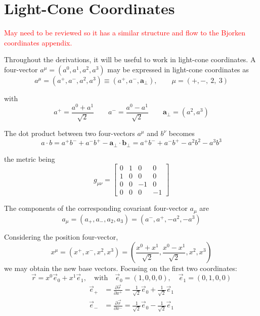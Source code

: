 \section{Light-Cone Coordinates}
\label{ap:Light_Cone}
\textcolor{red}{May need to be reviewed so it has a similar structure and flow to the Bjorken coordinates appendix.}

Throughout the derivations, it will be useful to work in light-cone coordinates. A four-vector $a^\mu = (a^0,a^1,a^2,a^3)$ may be expressed in light-cone coordinates as
\begin{equation}
  a^\mu = (a^+, a^-, a^2, a^3) \equiv (a^+, a^-, \mathbf{a}_\perp), \qquad \mu = (+,-,~2,~3)
\end{equation}

\noindent with
\begin{equation}
  a^+ = \frac{a^0 + a^1}{\sqrt{2}} \qquad a^- = \frac{a^0 - a^1}{\sqrt{2}} \qquad \mathbf{a}_\perp = (a^2,a^3)
\end{equation}

The dot product between two four-vectors $a^\mu$ and $b^\nu$ becomes
\begin{equation}
  a \cdot b =  a^+ b^- + a^- b^+ - \mathbf{a}_\perp \cdot \mathbf{b}_\perp = a^+ b^- + a^- b^+ - a^2 b^2 - a^3 b^3
\end{equation}

\noindent the metric being
\begin{equation}
  g_ {\mu \nu} = \begin{bmatrix}
    0 & 1 & 0 & 0 \\
    1 & 0 & 0 & 0 \\
    0 & 0 & -1 & 0 \\
    0 & 0 & 0 & -1
  \end{bmatrix}
  \label{eq:light_cone_metric}
\end{equation}

The components of the corresponding covariant four-vector $a_\mu$ are
\begin{equation}
  a_\mu = (a_+, a_-, a_2, a_3) = (a^-, a^+, -a^2, -a^3)
\end{equation}

Considering the position four-vector,
\begin{equation}
  x^\mu = (x^+, x^-, x^2, x^3) = \left( \frac{x^0+x^1}{\sqrt{2}}, \frac{x^0-x^1}{\sqrt{2}}, x^2, x^3  \right)
\end{equation}
we may obtain the new base vectors. Focusing on the first two coordinates:
\begin{equation}
  \vec{r} = x^0 \vec{e}_0 + x^1 \vec{e}_1, \quad \text{with} \quad \vec{e}_0 = (1,0,0,0), \quad \vec{e}_1=(0,1,0,0)
\end{equation}
\begin{equation}
  \begin{split}
    \vec{e}_+ & = \frac{\partial \vec{r}}{\partial x^+} = \frac{1}{\sqrt{2}} \vec{e}_0 + \frac{1}{\sqrt{2}} \vec{e}_1 \\
    \vec{e}_- & = \frac{\partial \vec{r}}{\partial x^-} = \frac{1}{\sqrt{2}} \vec{e}_0 - \frac{1}{\sqrt{2}} \vec{e}_1
  \end{split}
\end{equation}

